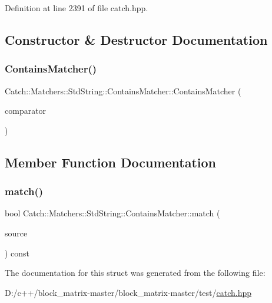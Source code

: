 Definition at line 2391 of file catch.\+hpp.



\subsection{Constructor \& Destructor Documentation}
\mbox{\label{struct_catch_1_1_matchers_1_1_std_string_1_1_contains_matcher_acc892883c8409e34b28c9b39d4ef1fe3}} 
\subsubsection{\texorpdfstring{Contains\+Matcher()}{ContainsMatcher()}}
{\footnotesize\ttfamily Catch\+::\+Matchers\+::\+Std\+String\+::\+Contains\+Matcher\+::\+Contains\+Matcher (\begin{DoxyParamCaption}\item[{\mbox{\hyperlink{struct_catch_1_1_matchers_1_1_std_string_1_1_cased_string}{Cased\+String}} const \&}]{comparator }\end{DoxyParamCaption})}



\subsection{Member Function Documentation}
\mbox{\label{struct_catch_1_1_matchers_1_1_std_string_1_1_contains_matcher_a630628b234b037be83fe587081a80b53}} 
\subsubsection{\texorpdfstring{match()}{match()}}
{\footnotesize\ttfamily bool Catch\+::\+Matchers\+::\+Std\+String\+::\+Contains\+Matcher\+::match (\begin{DoxyParamCaption}\item[{std\+::string const \&}]{source }\end{DoxyParamCaption}) const\hspace{0.3cm}{\ttfamily [override]}}



The documentation for this struct was generated from the following file\+:\begin{DoxyCompactItemize}
\item 
D\+:/c++/block\+\_\+matrix-\/master/block\+\_\+matrix-\/master/test/\mbox{\hyperlink{catch_8hpp}{catch.\+hpp}}\end{DoxyCompactItemize}
